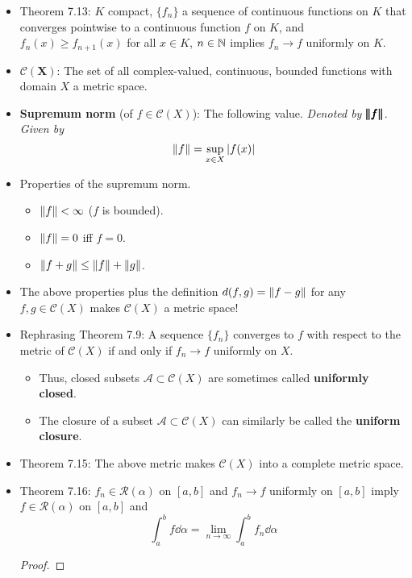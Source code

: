 \documentclass[../../notes.tex]{subfiles}
\begin{document}
\begin{itemize}
    \item Theorem 7.13: $K$ compact, $\{f_n\}$ a sequence of continuous functions on $K$ that converges pointwise to a continuous function $f$ on $K$, and $f_n(x)\geq f_{n+1}(x)$ for all $x\in K$, $n\in\mathbb{N}$ implies $f_n\to f$ uniformly on $K$.
    \item $\pmb{\mathscr{C}}\bm{(X)}$: The set of all complex-valued, continuous, bounded functions with domain $X$ a metric space.
    \item \textbf{Supremum norm} (of $f\in\mathscr{C}(X)$): The following value. \emph{Denoted by} $\pmb{\norm{f}}$. \emph{Given by}
    \begin{equation*}
        \norm{f} = \sup_{x\in X}|f(x)|
    \end{equation*}
    \item Properties of the supremum norm.
    \begin{itemize}
        \item $\norm{f}<\infty$ ($f$ is bounded).
        \item $\norm{f}=0$ iff $f=0$.
        \item $\norm{f+g}\leq\norm{f}+\norm{g}$.
    \end{itemize}
    \item The above properties plus the definition $d(f,g)=\norm{f-g}$ for any $f,g\in\mathscr{C}(X)$ makes $\mathscr{C}(X)$ a metric space!
    \item Rephrasing Theorem 7.9: A sequence $\{f_n\}$ converges to $f$ with respect to the metric of $\mathscr{C}(X)$ if and only if $f_n\to f$ uniformly on $X$.
    \begin{itemize}
        \item Thus, closed subsets $\mathscr{A}\subset\mathscr{C}(X)$ are sometimes called \textbf{uniformly closed}.
        \item The closure of a subset $\mathscr{A}\subset\mathscr{C}(X)$ can similarly be called the \textbf{uniform closure}.
    \end{itemize}
    \item Theorem 7.15: The above metric makes $\mathscr{C}(X)$ into a complete metric space.
    \item Theorem 7.16: $f_n\in\mathscr{R}(\alpha)$ on $[a,b]$ and $f_n\to f$ uniformly on $[a,b]$ imply $f\in\mathscr{R}(\alpha)$ on $[a,b]$ and
    \begin{equation*}
        \int_a^bf\dd{\alpha} = \lim_{n\to\infty}\int_a^bf_n\dd{\alpha}
    \end{equation*}
    \begin{proof}

\end{proof}
\end{itemize}
\end{document}
